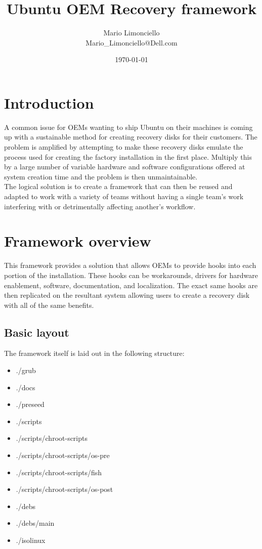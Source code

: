 \documentclass[letterpaper,10pt,titlepage]{article}
\title{\textbf{Ubuntu OEM Recovery framework}}
\author{Mario Limonciello\\ Mario\_Limonciello@Dell.com}
\date{\today}
\begin{document}
\maketitle

\tableofcontents 
\newpage

\section{Introduction}
A common issue for OEMs wanting to ship Ubuntu on their machines is coming up with a sustainable method for creating recovery disks for their customers.  The problem is amplified by attempting to make these recovery disks emulate the process used for creating the factory installation in the first place.  Multiply this by a large number of variable hardware and software configurations offered at system creation time and the problem is then unmaintainable.
\\
The logical solution is to create a framework that can then be reused and adapted to work with a variety of teams without having a single team's work interfering with or detrimentally affecting another's workflow.

\section{Framework overview}
This framework provides a solution that allows OEMs to provide hooks into each portion of the installation.  These hooks can be workarounds, drivers for hardware enablement, software, documentation, and localization.  The exact same hooks are then replicated on the resultant system allowing users to create a recovery disk with all of the same benefits.

\subsection{Basic layout}
The framework itself is laid out in the following structure:
\begin{itemize}
\item ./grub
\item ./docs  
\item ./preseed 
\item ./scripts 
\item ./scripts/chroot-scripts
\item ./scripts/chroot-scripts/os-pre
\item ./scripts/chroot-scripts/fish
\item ./scripts/chroot-scripts/os-post
\item ./debs
\item ./debs/main
\item ./isolinux
\end{itemize} 
\end{document}
